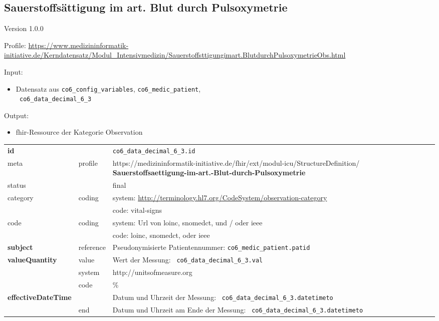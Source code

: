 \subsection{Sauerstoffsättigung im art. Blut durch Pulsoxymetrie} 
\noindent Version 1.0.0

\noindent Profile: \url{https://www.medizininformatik-initiative.de/Kerndatensatz/Modul_Intensivmedizin/Sauerstoffsttigungimart.BlutdurchPulsoxymetrieObs.html}

\noindent Input:
\begin{itemize}
	\item Datensatz aus \texttt{co6\_config\_variables}, \texttt{co6\_medic\_patient}, \\ \texttt{
co6\_data\_decimal\_6\_3}
\end{itemize}
Output:
\begin{itemize}
        \item \ac{fhir}-Ressource der Kategorie \glqq Observation\grqq{}
\end{itemize}
\begin{longtable}{|l|l|p{7.5cm}|}
        \hline
        \rowcolor{lightgray} \multicolumn{3}{|l|}{Data Mapping (inhaltlich)} \\ \hline
        \textbf{id} &  & \texttt{co6\_data\_decimal\_6\_3.id} \\ \hline
	meta & profile & https://medizininformatik-initiative.de/fhir/ext/modul-icu/StructureDefinition/\textbf{
Sauerstoffsaettigung-im-art.-Blut-durch-Pulsoxymetrie} \\ \hline 
	status &  & final   \\ \hline 
	category & coding & system: \url{http://terminology.hl7.org/CodeSystem/observation-category} \\
\cline{3-3}
	& & code: vital-signs \\ \hline
	code & coding & system: Url von \ac{loinc}, \ac{snomedct}, und / oder \ac{ieee} \\ 
	\cline{3-3} 
	 &  & code: \ac{loinc}, \ac{snomedct}, oder \ac{ieee} \\ \hline
	 \textbf{subject}  & reference & Pseudonymisierte Patientennummer: \texttt{co6\_medic\_patient.patid} \\ \hline
	 \textbf{valueQuantity}  & value & Wert der Messung: \texttt{
co6\_data\_decimal\_6\_3.val} \\
        \cline{2-3}
         & system & http://unitsofmeasure.org \\
         \cline{2-3}
         & code & \% \\ \hline
     \textbf{effectiveDateTime}  & & Datum und Uhrzeit der Messung: \texttt{
co6\_data\_decimal\_6\_3.datetimeto} \\
    \cline{2-3}
     & end & Datum und Uhrzeit am Ende der Messung: \texttt{
co6\_data\_decimal\_6\_3.datetimeto} \\ \hline
\end{longtable}


